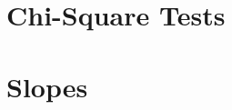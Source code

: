 \documentclass[../AP_Statistics.tex]{subfiles}
\begin{document}
	\chapter{Chi-Square Tests}
	\chapter{Slopes}
\end{document}
